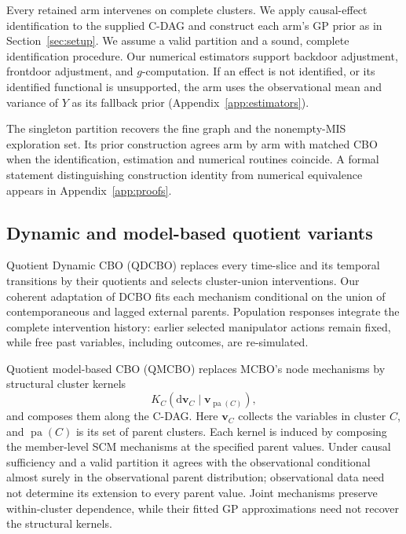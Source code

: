 \documentclass[twoside]{article}
\newcommand{\QMCBO}{\textsc{QMCBO}}
\begin{document}
Every retained arm intervenes on complete clusters. We apply
causal-effect identification to the supplied C-DAG and construct
each arm's GP prior as in Section~\ref{sec:setup}. We assume a
valid partition and a sound, complete identification procedure.
Our numerical estimators support backdoor adjustment, frontdoor
adjustment, and $g$-computation. If an effect is not identified,
or its identified functional is unsupported, the arm uses the
observational mean and variance of $Y$ as its fallback prior
(Appendix~\ref{app:estimators}).

The singleton partition recovers the fine graph and the nonempty-MIS exploration set. Its prior construction agrees arm by arm with matched CBO when the identification, estimation and numerical routines coincide. A formal statement distinguishing construction identity from numerical equivalence appears in Appendix~\ref{app:proofs}.

\subsection{Dynamic and model-based quotient variants}

Quotient Dynamic CBO (QDCBO) replaces every time-slice and its temporal transitions by their quotients and selects cluster-union interventions. Our coherent adaptation of DCBO \citep{agliettiDynamicCausalBayesian2021a} fits each mechanism conditional on the union of contemporaneous and lagged external parents. Population responses integrate the complete intervention history: earlier selected manipulator actions remain fixed, while free past variables, including outcomes, are re-simulated.

Quotient model-based CBO (\QMCBO{}) replaces MCBO's \citep{sussexMODELBASEDCAUSALBAYESIAN2023} node mechanisms by structural cluster kernels
\[
K_C(\mathrm d\mathbf v_C\mid\mathbf v_{\operatorname{pa}(C)}),
\]
and composes them along the C-DAG. Here $\mathbf v_C$ collects the variables in cluster $C$, and $\operatorname{pa}(C)$ is its set of parent clusters. Each kernel is induced by composing the member-level SCM mechanisms at the specified parent values. Under causal sufficiency and a valid partition it agrees with the observational conditional almost surely in the observational parent distribution; observational data need not determine its extension to every parent value. Joint mechanisms preserve within-cluster dependence, while their fitted GP approximations need not recover the structural kernels.
\end{document}
